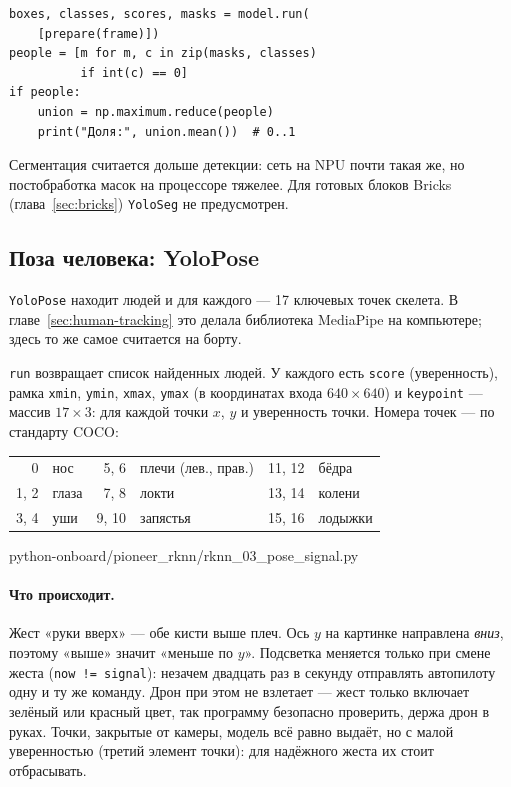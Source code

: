 \begin{codebox}
\begin{verbatim}
boxes, classes, scores, masks = model.run(
    [prepare(frame)])
people = [m for m, c in zip(masks, classes)
          if int(c) == 0]
if people:
    union = np.maximum.reduce(people)
    print("Доля:", union.mean())  # 0..1
\end{verbatim}
\end{codebox}

Сегментация считается дольше детекции: сеть на NPU почти такая же, но постобработка масок на процессоре тяжелее. Для готовых блоков Bricks (глава~\ref{sec:bricks}) \texttt{YoloSeg} не предусмотрен.

\subsection{Поза человека: YoloPose}

\verb|YoloPose| находит людей и для каждого --- 17 ключевых точек скелета. В главе~\ref{sec:human-tracking} это делала библиотека MediaPipe на компьютере; здесь то же самое считается на борту.

\verb|run| возвращает список найденных людей. У каждого есть \verb|score| (уверенность), рамка \verb|xmin|, \verb|ymin|, \verb|xmax|, \verb|ymax| (в координатах входа $640\times640$) и \verb|keypoint| --- массив $17\times3$: для каждой точки $x$, $y$ и уверенность точки. Номера точек --- по стандарту COCO:

\begin{center}
\small
\begin{tabular}{@{}rl rl rl@{}}
\toprule
0 & нос & 5, 6 & плечи (лев., прав.) & 11, 12 & бёдра \\
1, 2 & глаза & 7, 8 & локти & 13, 14 & колени \\
3, 4 & уши & 9, 10 & запястья & 15, 16 & лодыжки \\
\bottomrule
\end{tabular}
\end{center}

\begin{codefile}[python]{python-onboard/pioneer_rknn/rknn_03_pose_signal.py}
\end{codefile}

\paragraph{Что происходит.} Жест «руки вверх» --- обе кисти выше плеч. Ось $y$ на картинке направлена \emph{вниз}, поэтому «выше» значит «меньше по $y$». Подсветка меняется только при смене жеста (\verb|now != signal|): незачем двадцать раз в секунду отправлять автопилоту одну и ту же команду. Дрон при этом не взлетает --- жест только включает зелёный или красный цвет, так программу безопасно проверить, держа дрон в руках. Точки, закрытые от камеры, модель всё равно выдаёт, но с малой уверенностью (третий элемент точки): для надёжного жеста их стоит отбрасывать.

